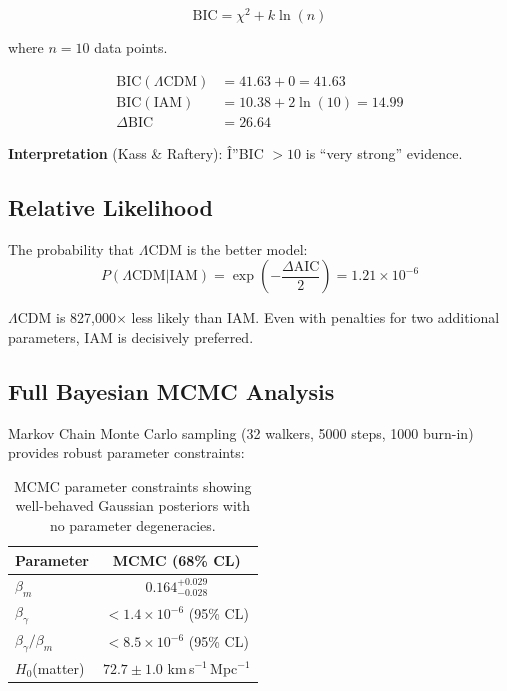 \documentclass[twocolumn,superscriptaddress,prl,amsmath,amssymb]{revtex4-2}
\begin{document}
\begin{equation}
\text{BIC} = \chi^2 + k \ln(n)
\end{equation}

where $n = 10$ data points.

\begin{align}
\text{BIC}(\Lambda\text{CDM}) &= 41.63 + 0 = 41.63 \nonumber\\
\text{BIC}(\text{IAM}) &= 10.38 + 2\ln(10) = 14.99 \nonumber\\
\Delta\text{BIC} &= 26.64
\end{align}

\textbf{Interpretation} (Kass \& Raftery): Î”BIC $> 10$ is ``very strong'' evidence.

\subsection{Relative Likelihood}

The probability that $\Lambda$CDM is the better model:
\begin{equation}
P(\Lambda\text{CDM} | \text{IAM}) = \exp\left(-\frac{\Delta\text{AIC}}{2}\right) = 1.21 \times 10^{-6}
\end{equation}

$\Lambda$CDM is 827,000$\times$ less likely than IAM. Even with penalties for two additional parameters, IAM is decisively preferred.

\subsection{Full Bayesian MCMC Analysis}

Markov Chain Monte Carlo sampling (32 walkers, 5000 steps, 1000 burn-in) provides robust parameter constraints:

\begin{table}[h]
\centering
\begin{tabular}{lc}
\hline\hline
Parameter & MCMC (68\% CL) \\
\hline
$\beta_m$ & $0.164^{+0.029}_{-0.028}$ \\
$\beta_\gamma$ & $< 1.4 \times 10^{-6}$ (95\% CL) \\
$\beta_\gamma/\beta_m$ & $< 8.5 \times 10^{-6}$ (95\% CL) \\
$H_0$(matter) & $72.7 \pm 1.0$ km\,s$^{-1}$\,Mpc$^{-1}$ \\
\hline\hline
\end{tabular}
\caption{MCMC parameter constraints showing well-behaved Gaussian posteriors with no parameter degeneracies.}
\end{table}
\end{document}
